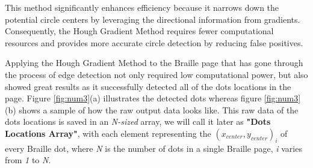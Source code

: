 This method significantly enhances efficiency because it narrows down the potential circle centers by leveraging the directional information from gradients. Consequently, the Hough Gradient Method requires fewer computational resources and provides more accurate circle detection by reducing false positives.

Applying the Hough Gradient Method to the Braille page that has gone through the process of edge detection not only required low computational power, but also showed great results as it successfully detected all of the dots locations in the page. Figure \ref{fig:num3}(a) illustrates the detected dots whereas figure \ref{fig:num3}(b) shows a sample of how the raw output data looks like. This raw data of the dots locations is saved in an \textit{N-sized} array, we will call it later as \textbf{"Dots Locations Array"}, with each element representing the \((x_{center}, y_{center})_i\) of every Braille dot, where \textit{N} is the number of dots in a single Braille page, \textit{i} varies from \textit{1} to \textit{N}.



